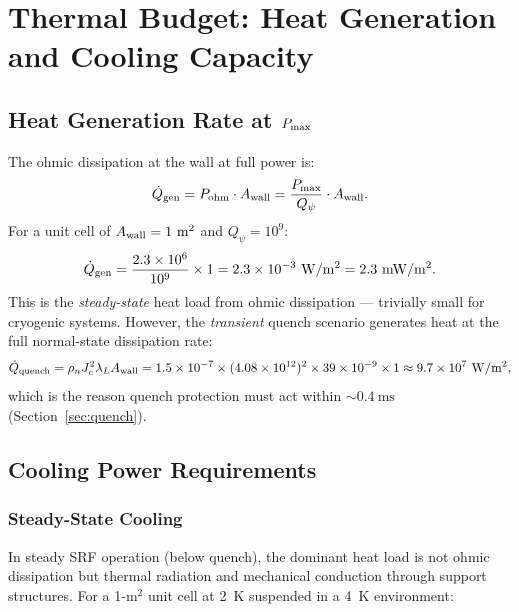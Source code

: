 \documentclass[aps,prd,twocolumn,superscriptaddress]{revtex4-2}
\newcommand{\Pmax}{P_{\rm max}}
\begin{document}
\section{Thermal Budget: Heat Generation and Cooling Capacity}
\label{sec:thermal_budget}

\subsection{Heat Generation Rate at $\Pmax$}

The ohmic dissipation at the wall at full power is:
\begin{equation}
\dot{Q}_{\rm gen} = P_{\rm ohm} \cdot A_{\rm wall}
= \frac{\Pmax}{Q_\psi} \cdot A_{\rm wall}.
\end{equation}
For a unit cell of $A_{\rm wall} = 1~\mathrm{m^2}$ and
$Q_\psi = 10^9$:
\begin{equation}
\dot{Q}_{\rm gen} = \frac{2.3\times 10^6}{10^9}\times 1
= 2.3\times 10^{-3}~\mathrm{W/m^2} = 2.3~\mathrm{mW/m^2}.
\end{equation}
This is the \emph{steady-state} heat load from ohmic dissipation ---
trivially small for cryogenic systems.  However, the \emph{transient}
quench scenario generates heat at the full normal-state dissipation rate:
\begin{equation}
\dot{Q}_{\rm quench} = \rho_n J_c^2 \lambda_L A_{\rm wall}
= 1.5\times 10^{-7} \times (4.08\times 10^{12})^2
\times 39\times 10^{-9}\times 1
\approx 9.7\times 10^7~\mathrm{W/m^2},
\end{equation}
which is the reason quench protection must act within $\sim 0.4~\mathrm{ms}$
(Section~\ref{sec:quench}).

\subsection{Cooling Power Requirements}

\subsubsection{Steady-State Cooling}

In steady SRF operation (below quench), the dominant heat load is not
ohmic dissipation but thermal radiation and mechanical conduction through
support structures.  For a 1-m$^2$ unit cell at 2~K suspended in a 4~K
environment:
\end{document}
